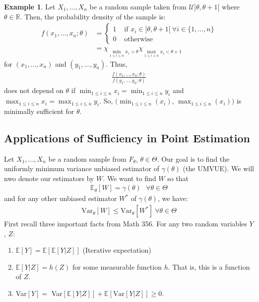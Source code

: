 \documentclass[11pt]{scrartcl}
\newcommand{\R}[0]{\mathbb{R}}
\theoremstyle{definition}
\newtheorem{ex}{Example}
\theoremstyle{remark}
\newcommand{\EX}[1]{\mathbb{E}\left[#1 \right]}
\newcommand{\EXth}[1]{\mathbb{E}_\theta \left[ #1 \right]}
\begin{document}
{ \begin{ex}
 	Let $X_1, ..., X_n$ be a random sample taken from $\mathcal{U} ] \theta, \theta + 1 [$ where $\theta \in \R$. Then, the probability density of the sample is: 
 	\begin{align*}
 		f(x_1, ..., x_n; \theta) & = \begin{cases}
 			1 & \text{ if } x_i \in ] \theta, \theta + 1 [\ \forall i \in \{ 1, ..., n \} \\
 			0 & \text{ otherwise } 
 		\end{cases} \\
 		& = \chi_{ \min_{1 \leq i \leq n} x_i > \theta} \chi_{\max_{1 \leq i \leq n } x_i < \theta + 1 }
 	\end{align*}
 	for $(x_1, ..., x_n)$ and $(y_1, ..., y_n)$. Thus, 
 	\begin{align*}
 		\frac{f(x_1, ..., x_n; \theta)}{f(y_1, ..., y_n; \theta)}
 	\end{align*}
 	does not depend on $\theta$ if $\min_{1 \leq i \leq n} x_i = \min_{1 \leq i \leq n} y_i$ and $\max_{1 \leq i \leq n} x_i = \max_{1 \leq i \leq n} y_i$. So, $(\min_{ 1 \leq i \leq n} (x_i)$, $\max_{1 \leq i \leq n} (x_i))$ is minimally sufficient for $\theta$. 
 \end{ex}
 
 \subsection{Applications of Sufficiency in Point Estimation}
 Let $X_1, ..., X_n$ be a random sample from $F_\theta$, $\theta \in \Theta$. Our goal is to find the uniformly minimum variance unbiased estimator of $\gamma(\theta)$ (the UMVUE). We will nwo denote our estimators by $W$. We want to find $W$ so that
 \begin{align*}
 	\EXth{W} = \gamma(\theta) \text{ 		} \forall \theta \in \Theta 
 \end{align*}
and for any other unbiased estimator $W^*$ of $\gamma(\theta)$, we have: 
\begin{align*}
	\text{Var}_\theta[W] \leq \text{Var}_\theta [W^*]\ \forall \theta \in \Theta 
\end{align*}
First recall three important facts from Math 356. For any two random variables $Y$, $Z$: 
\begin{enumerate}
	\item $\EX{Y} = \EX{\EX{Y|Z}}$ (Iterative expectation) 
	\item $\EX{Y|Z} = h(Z)$ for some measurable function $h$. That is, this is a function of $Z$. 
	\item Var$[Y] =$ Var$[\EX{Y|Z}] + \EX{\text{Var}[Y|Z]} \geq 0$. 
\end{enumerate}

}
\end{document}
